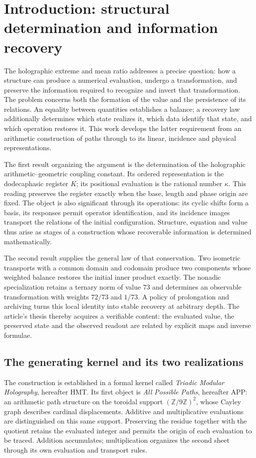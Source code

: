 \section*{Introduction: structural determination and information recovery}
\label{libro:prologo}
The holographic extreme and mean ratio addresses a precise question: how a structure can produce a numerical evaluation, undergo a transformation, and preserve the information required to recognize and invert that transformation. The problem concerns both the formation of the value and the persistence of its relations. An equality between quantities establishes a balance; a recovery law additionally determines which state realizes it, which data identify that state, and which operation restores it. This work develops the latter requirement from an arithmetic construction of paths through to its linear, incidence and physical representations.

The first result organizing the argument is the determination of the holographic arithmetic--geometric coupling constant. Its ordered representation is the dodecaphasic register \(K\); its positional evaluation is the rational number \(\kappa\). This reading preserves the register exactly when the base, length and phase origin are fixed. The object is also significant through its operations: its cyclic shifts form a basis, its responses permit operator identification, and its incidence images transport the relations of the initial configuration. Structure, equation and value thus arise as stages of a construction whose recoverable information is determined mathematically.

The second result supplies the general law of that conservation. Two isometric transports with a common domain and codomain produce two components whose weighted balance restores the initial inner product exactly. The nonadic specialization retains a ternary norm of value \(73\) and determines an observable transformation with weights \(72/73\) and \(1/73\). A policy of prolongation and archiving turns this local identity into stable recovery at arbitrary depth. The article's thesis thereby acquires a verifiable content: the evaluated value, the preserved state and the observed readout are related by explicit maps and inverse formulae.

\subsection*{The generating kernel and its two realizations}
The construction is established in a formal kernel called \emph{Triadic Modular Holography}, hereafter HMT. Its first object is \emph{All Possible Paths}, hereafter APP: an arithmetic path structure on the toroidal support \((\mathbb Z/9\mathbb Z)^2\), whose Cayley graph describes cardinal displacements. Additive and multiplicative evaluations are distinguished on this same support. Preserving the residue together with the quotient retains the evaluated integer and permits the origin of each evaluation to be traced. Addition accumulates; multiplication organizes the second sheet through its own evaluation and transport rules.

